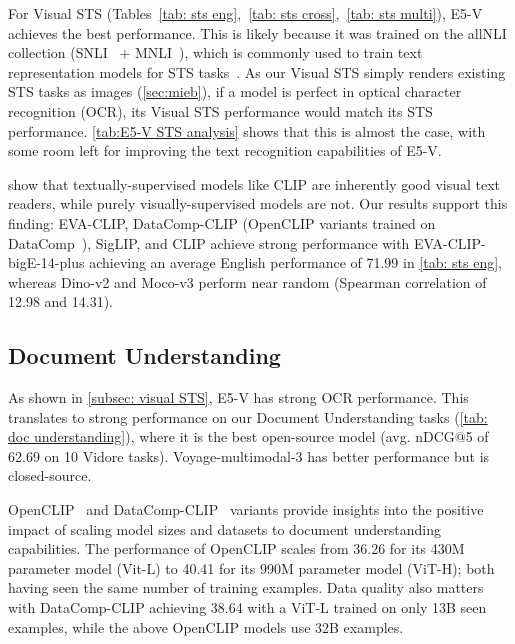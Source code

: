 For Visual STS (Tables~\ref{tab: sts eng},~\ref{tab: sts cross},~\ref{tab: sts multi}), E5-V \cite{jiang2024e5} achieves the best performance. This is likely because it was trained on the allNLI collection (SNLI~\citep{bowman-etal-2015-large} + MNLI~\citep{williams-etal-2018-broad}), which is commonly used to train text representation models for STS tasks~\citep{reimers2019sentence}. As our Visual STS simply renders existing STS tasks as images (\autoref{sec:mieb}), if a model is perfect in optical character recognition (OCR), its Visual STS performance would match its STS performance. \autoref{tab:E5-V STS analysis} shows that this is almost the case, with some room left for improving the text recognition capabilities of E5-V.

\citet{tong2024cambrian} show that textually-supervised models like CLIP are inherently good visual text readers, while purely visually-supervised models are not. Our results support this finding: EVA-CLIP, DataComp-CLIP (OpenCLIP variants trained on DataComp~\citep{gadre2024datacomp}), SigLIP, and CLIP achieve strong performance with EVA-CLIP-bigE-14-plus achieving an average English performance of 71.99 in \autoref{tab: sts eng}, whereas Dino-v2 and Moco-v3 perform near random (Spearman correlation of 12.98 and 14.31).

\subsection{Document Understanding}
\label{subsec: doc understanding}

As shown in \autoref{subsec: visual STS}, E5-V has strong OCR performance. This translates to strong performance on our Document Understanding tasks (\autoref{tab: doc understanding}), where it is the best open-source model (avg. nDCG@5 of 62.69 on 10 Vidore tasks). Voyage-multimodal-3 has better performance but is closed-source.

OpenCLIP~\citep{cherti2023reproducible} and DataComp-CLIP~\citep{gadre2024datacomp} variants provide insights into the positive impact of scaling model sizes and datasets to document understanding capabilities. The performance of OpenCLIP scales from 36.26 for its 430M parameter model (Vit-L) to 40.41 for its 990M parameter model (ViT-H); both having seen the same number of training examples. Data quality also matters with DataComp-CLIP achieving 38.64 with a ViT-L trained on only 13B seen examples, while the above OpenCLIP models use 32B examples.


